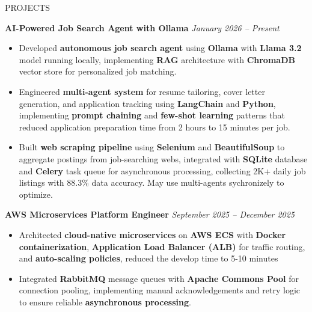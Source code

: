 \begin{rSection}{PROJECTS}
    \setlength{\parskip}{1pt}
    \setlength{\baselineskip}{1pt}

    \textbf{AI-Powered Job Search Agent with Ollama} \hfill \textit{January 2026 – Present}
    \vspace{-3pt}
\begin{itemize}
    \item Developed \textbf{autonomous job search agent} using \textbf{Ollama} with \textbf{Llama 3.2} model running locally, implementing \textbf{RAG} architecture with \textbf{ChromaDB} vector store for personalized job matching.
    
    \item Engineered \textbf{multi-agent system}  for resume tailoring, cover letter generation, and application tracking using \textbf{LangChain} and \textbf{Python}, implementing \textbf{prompt chaining} and \textbf{few-shot learning} patterns that reduced application preparation time from 2 hours to 15 minutes per job.
    
    \item Built \textbf{web scraping pipeline} using \textbf{Selenium} and \textbf{BeautifulSoup} to aggregate postings from job-searching webs, integrated with \textbf{SQLite} database and \textbf{Celery} task queue for asynchronous processing, collecting 2K+ daily job listings with 88.3\% data accuracy. May use multi-agents sychronizely to optimize.
    
 
\end{itemize}
\textbf{AWS Microservices Platform Engineer} \hfill \textit{September 2025 – December 2025}
\begin{itemize}
    \item Architected \textbf{cloud-native microservices} on \textbf{AWS ECS} with \textbf{Docker containerization}, \textbf{Application Load Balancer (ALB)} for traffic routing, and \textbf{auto-scaling policies}, reduced the develop time to 5-10 minutes
    
    
    
    \item Integrated \textbf{RabbitMQ} message queues with \textbf{Apache Commons Pool} for connection pooling, implementing manual acknowledgements and retry logic to ensure reliable \textbf{asynchronous processing}.
    

\end{itemize}
\end{rSection}
